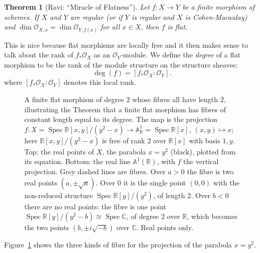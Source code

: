 \documentclass[12pt]{article}
\numberwithin{equation}{section}
\newtheorem{theorem}{Theorem}[subsection]
\theoremstyle{definition}
\theoremstyle{remark}
\newcommand{\RR}{\mathbb{R}}
\newcommand{\CC}{\mathbb{C}}
\newcommand{\Ocal}{\mathcal{O}}
\renewcommand{\AA}{\mathbb{A}}
\newcommand{\Spec}{\operatorname{Spec}}
\begin{document}
\begin{theorem}[Ravi: ``Miracle of Flatness'']
	Let $f:X\to Y$ be a finite morphism of schemes. 
	If $X$ and $Y$ are regular (or if $Y$ is regular and $X$ is Cohen-Macaulay) and $\dim \Ocal_{X,x} = \dim \Ocal_{Y,f(x)}$ for all $x\in X$, then $f$ is flat. 
\end{theorem}
This is nice because flat morphisms are locally free and it then makes sense to talk about the rank of $f_*\Ocal_X$ as an $\Ocal_Y$-module.
We define the \emph{degree} of a flat morphism to be the rank of the module structure on the structure sheaves:
$$\deg(f) = [f_*\Ocal_X:\Ocal_Y].$$
where $[f_*\Ocal_X:\Ocal_Y]$ denotes this local rank.
\begin{figure}[H]
\centering

\caption{A finite flat morphism of degree $2$ whose fibres all have length $2$, illustrating the Theorem that a finite flat morphism has fibres of constant length equal to its degree. The map is the projection $f:X=\Spec\RR[x,y]/(y^2-x)\to\AA^1_{\RR}=\Spec\RR[x]$, $(x,y)\mapsto x$; here $\RR[x,y]/(y^2-x)$ is free of rank $2$ over $\RR[x]$ with basis $1,y$. Top: the real points of $X$, the parabola $x=y^2$ (black), plotted from its equation. Bottom: the real line $\AA^1(\RR)$, with $f$ the vertical projection. Grey dashed lines are fibres. Over $a>0$ the fibre is two real points $(a,\pm\sqrt a)$. Over $0$ it is the single point $(0,0)$ with the non-reduced structure $\Spec\RR[y]/(y^2)$, of length $2$. Over $b<0$ there are no real points: the fibre is one point $\Spec\RR[y]/(y^2-b)\cong\Spec\CC$, of degree $2$ over $\RR$, which becomes the two points $(b,\pm i\sqrt{-b})$ over $\CC$. Real points only.}\label{fig:parabola-flat-fibres}
\end{figure}
Figure~\ref{fig:parabola-flat-fibres} shows the three kinds of fibre for the projection of the parabola $x=y^2$.
\end{document}
